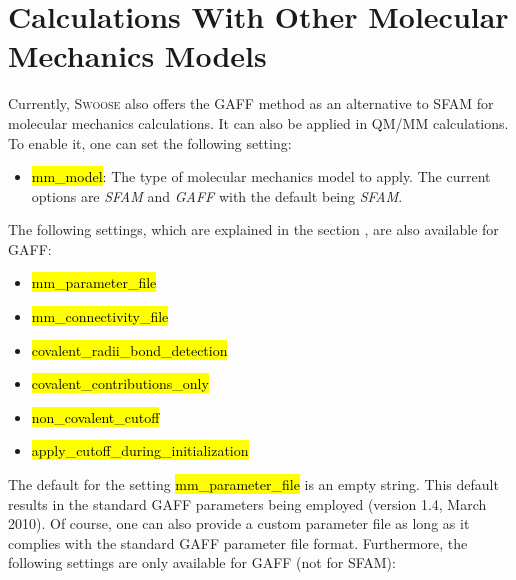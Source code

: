 \documentclass[]{tufte-book}
\begin{document}
{{\chapter{Calculations With Other Molecular Mechanics Models}\label{ch:mm_calculation_gaff}

Currently, \textsc{Swoose} also offers the GAFF method\cite{gaff} as an alternative to SFAM for molecular mechanics calculations. It can also be applied in QM/MM calculations. To enable it, one can set the following setting:
\begin{itemize}
\item \hl{mm\_model}: The type of molecular mechanics model to apply. The current options are \textit{SFAM} and \textit{GAFF} with the default being \textit{SFAM}.
\end{itemize}

The following settings, which are explained in the section , are also available for GAFF:

\begin{itemize}
\item \hl{mm\_parameter\_file}
\item \hl{mm\_connectivity\_file}
\item \hl{covalent\_radii\_bond\_detection}
\item \hl{covalent\_contributions\_only}
\item \hl{non\_covalent\_cutoff}
\item \hl{apply\_cutoff\_during\_initialization}
\end{itemize}

The default for the setting \hl{mm\_parameter\_file} is an empty string. This default results in the standard GAFF parameters being employed (version 1.4, March 2010). Of course, one can also provide a custom parameter file as long as it complies with the standard GAFF parameter file format.
Furthermore, the following settings are only available for GAFF (not for SFAM):

}}
\end{document}
